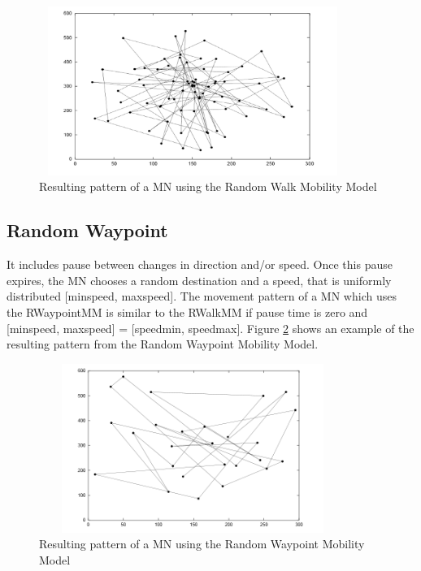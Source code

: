 \begin{figure}[h]
\center
\includegraphics[width=10cm,height=55mm]{../images/randomwalk1.png}
\caption{\label{RandomWalkFig}Resulting pattern of a MN using the Random Walk Mobility Model}
\end{figure}

\newpage

\subsection{Random Waypoint}

It includes pause between changes in direction and/or speed. Once this pause expires, the MN chooses a random destination and a speed, that is uniformly distributed [minspeed, maxspeed]. The movement pattern of a MN which uses the RWaypointMM is similar to the RWalkMM if pause time is zero and [minspeed, maxspeed] = [speedmin, speedmax]. Figure \ref{RandomWaypointFig} shows an example of the resulting pattern from the Random Waypoint Mobility Model.\\

\begin{figure}[h]
\center
\includegraphics[width=10cm,height=55mm]{../images/randomwaypoint1.png}
\caption{\label{RandomWaypointFig}Resulting pattern of a MN using the Random Waypoint Mobility Model}
\end{figure}

